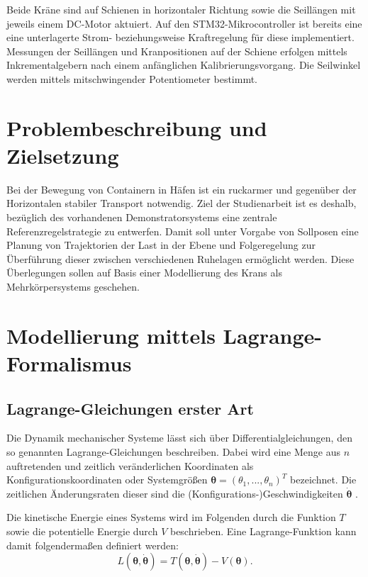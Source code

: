 Beide Kräne sind auf Schienen in horizontaler Richtung sowie die Seillängen mit jeweils einem DC-Motor aktuiert. Auf den STM32-Mikrocontroller ist bereits eine eine unterlagerte Strom- beziehungsweise Kraftregelung für diese implementiert.
Messungen der Seillängen und Kranpositionen auf der Schiene erfolgen mittels Inkrementalgebern nach einem anfänglichen Kalibrierungsvorgang. Die Seilwinkel werden mittels mitschwingender Potentiometer bestimmt.




\section{Problembeschreibung und Zielsetzung}
Bei der Bewegung von Containern in Häfen ist ein ruckarmer und gegenüber der Horizontalen stabiler Transport notwendig. Ziel der Studienarbeit ist es deshalb,  bezüglich des vorhandenen Demonstratorsystems eine zentrale Referenzregelstrategie zu entwerfen. Damit soll unter Vorgabe von Sollposen eine Planung von Trajektorien der Last in der Ebene und Folgeregelung zur Überführung dieser zwischen verschiedenen Ruhelagen ermöglicht werden. Diese Überlegungen sollen auf Basis einer Modellierung des Krans als Mehrkörpersystems geschehen. 

\section{Modellierung mittels Lagrange-Formalismus}

\subsection{Lagrange-Gleichungen erster Art}
Die Dynamik mechanischer Systeme lässt sich über Differentialgleichungen, den so genannten Lagrange-Gleichungen beschreiben. Dabei wird eine Menge aus $n$ auftretenden und zeitlich veränderlichen Koordinaten als Konfigurationskoordinaten oder Systemgrößen $\pmb{\theta} = (\theta_1, ..., \theta_n)^T$ bezeichnet. Die zeitlichen Änderungsraten dieser sind die (Konfigurations-)Geschwindigkeiten $\pmb{\dot{\theta}}$ \cite[S.7]{DissKnoll}. 

Die kinetische Energie eines Systems wird im Folgenden durch die Funktion $T$ sowie die potentielle Energie durch $V$ beschrieben. Eine Lagrange-Funktion kann damit folgendermaßen definiert werden:
\begin{equation}
	L(\pmb{\theta}, \dot{\pmb{\theta}}) = T(\pmb{\theta}, \pmb{\dot{\theta}}) - V(\pmb{\theta}).
\end{equation}

